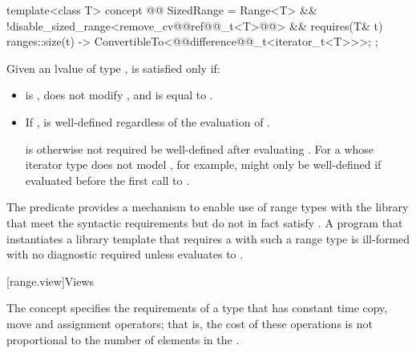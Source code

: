{%
\begin{itemdecl}
template<class T>
concept @@ SizedRange =
  Range<T> &&
  !disable_sized_range<remove_cv@@ref@@_t<T>@\oldtxt{>}@> &&
  requires(T& t) {
    { ranges::size(t) } -> ConvertibleTo<@@difference@@_t<iterator_t<T>>>;
  };
\end{itemdecl}

\begin{itemdescr}
\pnum
Given an lvalue  of type ,  is satisfied only if:

\begin{itemize}
\item {} is , does not modify , and is equal
to .

\item If    ,
 is well-defined regardless of the evaluation of
.
\begin{note}
 is otherwise not required be
well-defined after evaluating . For a 
whose iterator type does not model , for
example,  might only be well-defined if evaluated before
the first call to .
\end{note}
\end{itemize}

\pnum
\begin{note}
The  predicate provides a mechanism to enable use
of range types with the library that meet the syntactic requirements but do
not in fact satisfy . A program that instantiates a library template
that requires a  with such a range type  is ill-formed with no
diagnostic required unless
 evaluates
to .
\end{note}
\end{itemdescr}

[range.view]{Views}

\pnum
The  concept specifies the requirements of a
 type that has constant time copy, move and assignment operators; that
is, the cost of these operations is not proportional to the number of elements in
the .

}
